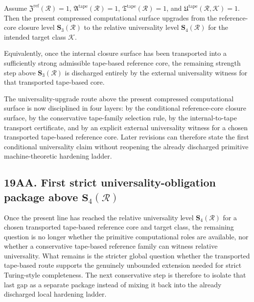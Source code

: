 \begin{proposition}
Assume \(\mathfrak Z^{\mathrm{ref}}(\mathcal R)=1\), \(\mathfrak A^{\mathrm{tape}}(\mathcal R)=1\), \(\mathfrak T^{\mathrm{tape}}(\mathcal R)=1\), and \(\mathfrak U^{\mathrm{tape}}(\mathcal R,\mathcal K)=1\). Then the present compressed computational surface upgrades from the reference-core closure level \(\mathbf S_3(\mathcal R)\) to the relative universality level \(\mathbf S_4(\mathcal R)\) for the intended target class \(\mathcal K\).

Equivalently, once the internal closure surface has been transported into a sufficiently strong admissible tape-based reference core, the remaining strength step above \(\mathbf S_3(\mathcal R)\) is discharged entirely by the external universality witness for that transported tape-based core.
\end{proposition}

\begin{corollary}
The universality-upgrade route above the present compressed computational surface is now disciplined in four layers: by the conditional reference-core closure surface, by the conservative tape-family selection rule, by the internal-to-tape transport certificate, and by an explicit external universality witness for a chosen transported tape-based reference core. Later revisions can therefore state the first conditional universality claim without reopening the already discharged primitive machine-theoretic hardening ladder.
\end{corollary}




\subsection*{19AA. First strict universality-obligation package above \(\mathbf S_4(\mathcal R)\)}
Once the present line has reached the relative universality level \(\mathbf S_4(\mathcal R)\) for a chosen transported tape-based reference core and target class, the remaining question is no longer whether the primitive computational roles are available, nor whether a conservative tape-based reference family can witness relative universality. What remains is the stricter global question whether the transported tape-based route supports the genuinely unbounded extension needed for strict Turing-style completeness. The next conservative step is therefore to isolate that last gap as a separate package instead of mixing it back into the already discharged local hardening ladder.

